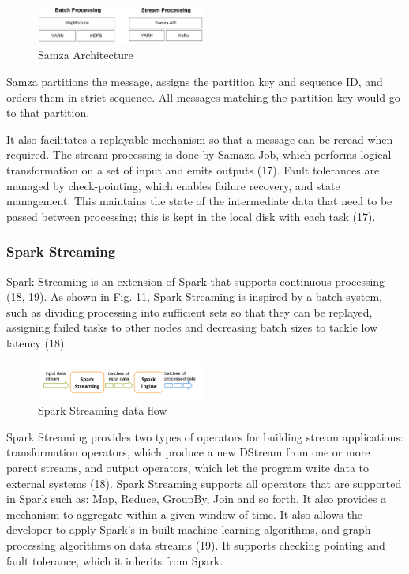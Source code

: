 \begin{figure}[H]
\centering
\includegraphics[width=0.5\textwidth]{Figures/samza.png}
\caption{Samza Architecture}\label{fig-real-samza}
\end{figure}

Samza partitions the message, assigns the partition key and sequence ID, and orders them in strict sequence. All messages matching the partition key would go to that partition.

It also facilitates a replayable mechanism so that a message can be reread when required. The stream processing is done by Samaza Job, which performs logical transformation on a set of input and emits outputs (17). Fault tolerances are managed by check-pointing, which enables failure recovery, and state management. This maintains the state of the intermediate data that need to be passed between processing; this is kept in the local disk with each task (17).

\subsubsection{Spark Streaming} \label{subsubsec-lr-reallayer-spark}
Spark Streaming is an extension of Spark that supports continuous processing (18, 19). As shown in Fig. 11, Spark Streaming is inspired by a batch system, such as dividing processing into sufficient sets so  that they can be replayed, assigning failed tasks to other nodes and decreasing batch sizes to tackle low latency (18).

\begin{figure}[H]
\centering
\includegraphics[width=0.5\textwidth]{Figures/spark_stream.png}
\caption{Spark Streaming data flow}\label{fig-real-spark}
\end{figure}
Spark Streaming provides two types of operators for building stream applications: transformation operators, which produce a new DStream from one or more parent streams, and output operators, which let the program write data to external systems (18). Spark Streaming supports all operators that are supported in Spark such as: Map, Reduce, GroupBy, Join and so forth. It also provides a mechanism to aggregate within a given window of time. It also allows the developer to apply Spark’s in-built machine learning algorithms, and graph processing algorithms on data streams (19). It supports checking pointing and fault tolerance, which it inherits from Spark.

